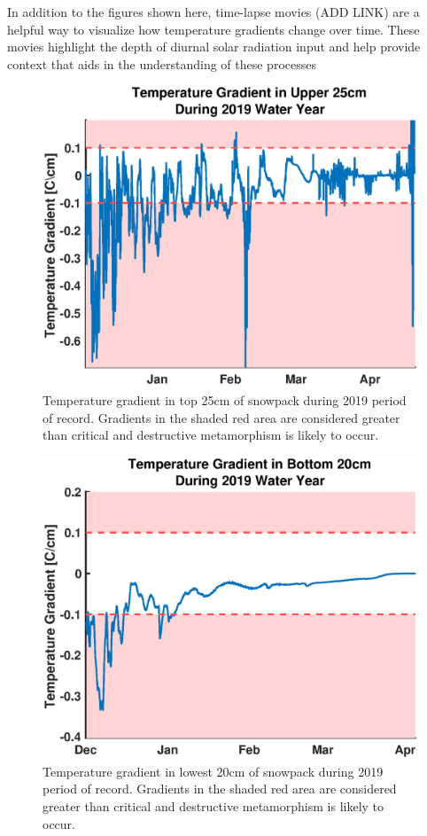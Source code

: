 In addition to the figures shown here, time-lapse movies (ADD LINK) are a helpful way to visualize how temperature gradients change over time. These movies highlight the depth of diurnal solar radiation input and help provide context that aids in the understanding of these processes

 \begin{figure}[H]
    \centering
    \includegraphics[width=0.65\linewidth]{figures/TempGrad/WY2019_U25_Grad.eps}
    \caption{Temperature gradient in top 25cm of snowpack during 2019 period of record. Gradients in the shaded red area are considered greater than critical and destructive metamorphism is likely to occur.}
    \label{fig:WY2019_U25_Grad}
 \end{figure}

 \begin{figure}[H]
    \centering
    \includegraphics[width=0.65\linewidth]{figures/TempGrad/WY2019_L20_Grad.eps}
    \caption{Temperature gradient in lowest 20cm of snowpack during 2019 period of record. Gradients in the shaded red area are considered greater than critical and destructive metamorphism is likely to occur.}
    \label{fig:WY2019_L20_Grad}
 \end{figure}
 
